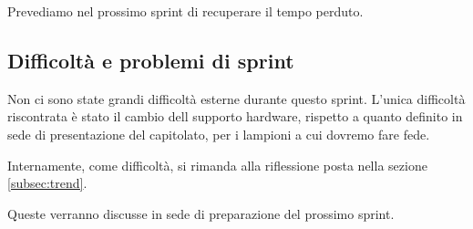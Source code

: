 Prevediamo nel prossimo sprint di recuperare il tempo perduto.

\subsection{Difficoltà e problemi di sprint}

Non ci sono state grandi difficoltà esterne durante questo sprint. L'unica difficoltà riscontrata è stato il cambio dell supporto hardware, rispetto a quanto definito in sede di presentazione del capitolato, per i lampioni a cui dovremo fare fede.

Internamente, come difficoltà, si rimanda alla riflessione posta nella sezione \ref{subsec:trend}.

Queste verranno discusse in sede di preparazione del prossimo sprint.